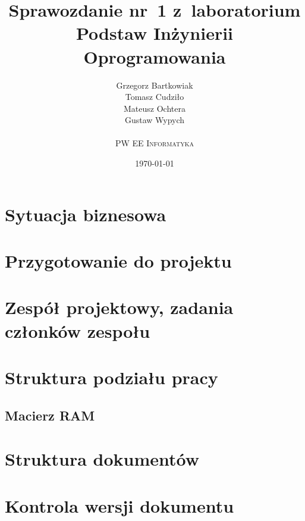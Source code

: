 \documentclass[10pt,a4paper]{article}
\begin{document}
\title{
  Sprawozdanie nr~1 z~laboratorium\\Podstaw Inżynierii Oprogramowania
}
\author{
  Grzegorz Bartkowiak\\
  Tomasz Cudziło\\
  Mateusz Ochtera\\
  Gustaw Wypych\\
  \\
  \textsc{PW EE Informatyka}\\[10pt]
}
\date{\today}

\maketitle

\section{Sytuacja biznesowa}

\section{Przygotowanie do projektu}

\section{Zespół projektowy, zadania członków zespołu}

\section{Struktura podziału pracy}
\subsection{Macierz RAM}

\section{Struktura dokumentów}

\section{Kontrola wersji dokumentu}
\end{document}
